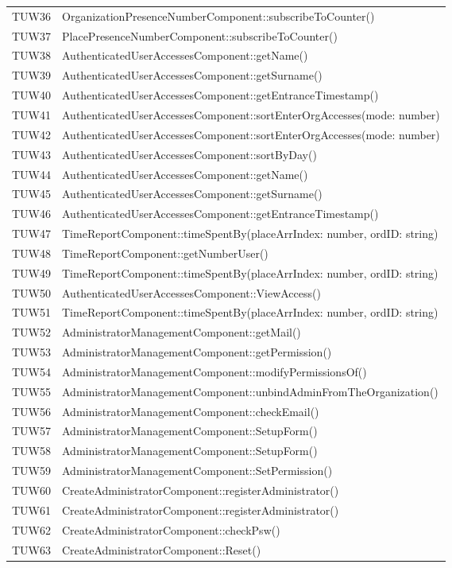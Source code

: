 {\begin{longtable}{C{2cm} C{12cm}}
		TUW36 & OrganizationPresenceNumberComponent::subscribeToCounter() \\
		TUW37 & PlacePresenceNumberComponent::subscribeToCounter() \\
		TUW38 & AuthenticatedUserAccessesComponent::getName() \\
		TUW39 & AuthenticatedUserAccessesComponent::getSurname() \\
		TUW40 & AuthenticatedUserAccessesComponent::getEntranceTimestamp() \\
		TUW41 & AuthenticatedUserAccessesComponent::sortEnterOrgAccesses(mode: number) \\
		TUW42 & AuthenticatedUserAccessesComponent::sortEnterOrgAccesses(mode: number) \\
		TUW43 & AuthenticatedUserAccessesComponent::sortByDay() \\
		TUW44 & AuthenticatedUserAccessesComponent::getName() \\
		TUW45 & AuthenticatedUserAccessesComponent::getSurname() \\
		TUW46 & AuthenticatedUserAccessesComponent::getEntranceTimestamp() \\
		TUW47 & TimeReportComponent::timeSpentBy(placeArrIndex: number, ordID: string) \\
		TUW48 & TimeReportComponent::getNumberUser() \\
		TUW49 & TimeReportComponent::timeSpentBy(placeArrIndex: number, ordID: string) \\
		TUW50 & AuthenticatedUserAccessesComponent::ViewAccess() \\
		TUW51 & TimeReportComponent::timeSpentBy(placeArrIndex: number, ordID: string) \\
		TUW52 & AdministratorManagementComponent::getMail() \\
		TUW53 & AdministratorManagementComponent::getPermission() \\
		TUW54 & AdministratorManagementComponent::modifyPermissionsOf() \\
		TUW55 & AdministratorManagementComponent::unbindAdminFromTheOrganization() \\
		TUW56 & AdministratorManagementComponent::checkEmail() \\
		TUW57 & AdministratorManagementComponent::SetupForm() \\
		TUW58 & AdministratorManagementComponent::SetupForm() \\
		TUW59 & AdministratorManagementComponent::SetPermission() \\
		TUW60 & CreateAdministratorComponent::registerAdministrator() \\
		TUW61 & CreateAdministratorComponent::registerAdministrator() \\
		TUW62 & CreateAdministratorComponent::checkPsw() \\
		TUW63 & CreateAdministratorComponent::Reset() \\
		
	\end{longtable}
}